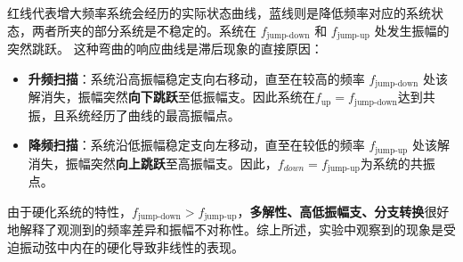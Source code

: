 \documentclass[10pt,twocolumn]{article}
\begin{document}
红线代表增大频率系统会经历的实际状态曲线，蓝线则是降低频率对应的系统状态，两者所夹的部分系统是不稳定的。系统在 $f_{\text{jump-down}}$ 和 $f_{\text{jump-up}}$ 处发生振幅的突然跳跃。
这种弯曲的响应曲线是滞后现象的直接原因：
\begin{itemize}
    \item \textbf{升频扫描}：系统沿高振幅稳定支向右移动，直至在较高的频率 $f_{\text{jump-down}}$ 处该解消失，振幅突然\textbf{向下跳跃}至低振幅支。因此系统在$f_{\text{up}} = f_{\text{jump-down}}$达到共振，且系统经历了曲线的最高振幅点。
    \item \textbf{降频扫描}：系统沿低振幅稳定支向左移动，直至在较低的频率 $f_{\text{jump-up}}$ 处该解消失，振幅突然\textbf{向上跳跃}至高振幅支。因此，$f_{down} = f_{\text{jump-up}}$为系统的共振点。
\end{itemize}

由于硬化系统的特性，$f_{\text{jump-down}} > f_{\text{jump-up}}$，\textbf{多解性、高低振幅支、分支转换}很好地解释了观测到的频率差异和振幅不对称性。综上所述，实验中观察到的现象是受迫振动弦中内在的硬化导致非线性的表现。
\end{document}
